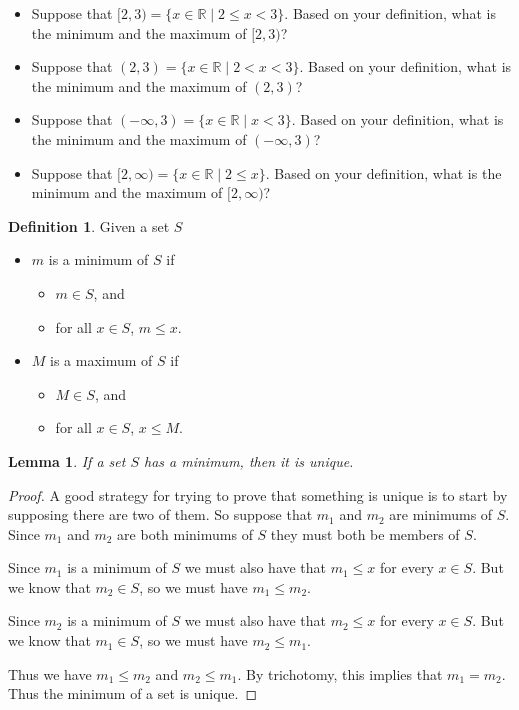 \documentclass[11pt]{article}
\newenvironment{task}
	{\begin{mdframed}[linecolor=lightgray, linewidth=3pt]\raggedright}
	{\end{mdframed}}
\newtheorem{lemma}[theorem]{Lemma}
\theoremstyle{definition}
\newtheorem{definition}[theorem]{Definition}
\begin{document}
\begin{task}
\begin{itemize}
      \begin{itemize}
        \item Suppose that $[2,3) = \{ x \in\mathbb{R} \mid 2\leq x < 3\}$. Based on your definition, what is the minimum and the maximum of $[2,3)$?
        \item Suppose that $(2,3) = \{ x \in\mathbb{R} \mid 2 < x < 3\}$. Based on your definition, what is the minimum and the maximum of $(2,3)$?
        \item Suppose that $(-\infty,3) = \{ x \in\mathbb{R} \mid x < 3\}$. Based on your definition, what is the minimum and the maximum of $(-\infty,3)$?
        \item Suppose that $[2,\infty) = \{ x \in\mathbb{R} \mid 2\leq x \}$. Based on your definition, what is the minimum and the maximum of $[2,\infty)$?
      \end{itemize}
  \end{itemize}
\end{task}

\begin{definition}
  Given a set $S$
  \begin{itemize}
    \item $m$ is a minimum of $S$ if
      \begin{itemize}
        \item $m\in S$, and 
        \item for all $x \in S$, $m\leq x$.
      \end{itemize}
    \item $M$ is a maximum of $S$ if
      \begin{itemize}
        \item $M\in S$, and 
        \item for all $x \in S$, $x\leq M$.
      \end{itemize}
  \end{itemize}
\end{definition}

\begin{lemma}
  If a set $S$ has a minimum, then it is unique.
  \label{lemma: minimums are unique}
\end{lemma}
\begin{proof}
  A good strategy for trying to prove that something is unique is to start by supposing there are two of them. So suppose that $m_1$ and $m_2$ are minimums of
  $S$. Since $m_1$ and $m_2$ are both minimums of $S$ they must both be members of $S$. 
  
  Since $m_1$ is a minimum of $S$ we must also have that $m_1 \leq x$ for every $x\in S$. But we know that $m_2\in S$, so we must have $m_1 \leq m_2$.

  Since $m_2$ is a minimum of $S$ we must also have that $m_2 \leq x$ for every $x\in S$. But we know that $m_1\in S$, so we must have $m_2 \leq m_1$.

  Thus we have $m_1\leq m_2$ and $m_2 \leq m_1$. By trichotomy, this implies that $m_1=m_2$. Thus the minimum of a set is unique.
\end{proof}
\end{document}
